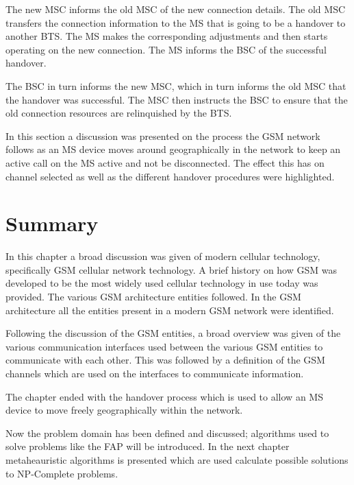 \begin{description}
The new MSC informs the old MSC of the new connection details. The old MSC transfers the connection information to the MS that is going to be a handover to another BTS\@. The MS makes the corresponding adjustments and then starts operating on the new connection. The MS informs the BSC of the successful handover\cite{wirelesstelcoMullet,GSMArchitectureProtocolsServices}. 

The BSC in turn informs the new MSC, which in turn informs the old MSC that the handover was successful. The MSC then instructs the BSC to ensure that the old connection resources are relinquished by the BTS.
\end{description}

In this section a discussion was presented on the process the GSM network follows as an MS device moves around geographically in the network to keep an active call on the MS active and not be disconnected. The effect this has on channel selected as well as the different handover procedures were highlighted. 
\section{Summary}
In this chapter a broad discussion was given of modern cellular technology, specifically GSM cellular network technology. A brief history on how GSM was developed to be the most widely used cellular technology in use today was provided. The various GSM architecture entities followed. In the GSM architecture all the entities present in a modern GSM network were identified.

Following the discussion of the GSM entities, a broad overview was given of the various communication interfaces used between the various GSM entities to communicate with each other. This was followed by a definition of the GSM channels which are used on the interfaces to communicate information.

The chapter ended with the handover process which is used to allow an MS device to move freely geographically within the network. 

Now the problem domain has been defined and discussed; algorithms used to solve problems like the FAP will be introduced. In the next chapter metaheauristic algorithms is presented which are used calculate possible solutions to NP-Complete problems.

